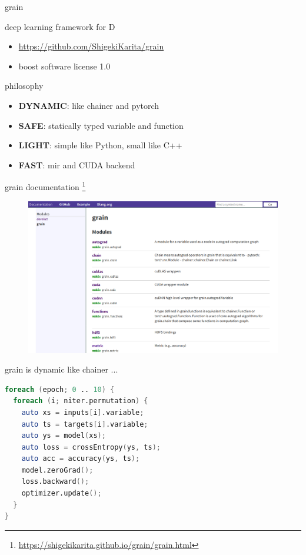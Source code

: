 \documentclass[aspectratio=169,
  14pt,xcolor=dvipsnames,table,professional font,dvipdfmx]{beamer}
\begin{document}
\begin{frame}{grain}
  \begin{alertblock}{deep learning framework for D}
    \begin{itemize}
    \item \alert{\url{https://github.com/ShigekiKarita/grain}}
    \item boost software license 1.0
    \end{itemize}
  \end{alertblock}
  \begin{exampleblock}{philosophy}
    \begin{itemize}
    \item \textbf{DYNAMIC}: like chainer and pytorch
    \item \textbf{SAFE}: statically typed variable and function
    \item \textbf{LIGHT}: simple like Python, small like C++
    \item \textbf{FAST}: mir and CUDA backend
    \end{itemize}
  \end{exampleblock}
\end{frame}

\begin{frame}[fragile]{grain}
  documentation
  \footnote{\alert{\url{https://shigekikarita.github.io/grain/grain.html}}}
  \begin{figure}[b]
	\centering
	\includegraphics[height=0.6\textheight]{./fig/doc.png}
  \end{figure}
  \scriptsize
\end{frame}

\begin{frame}[fragile]{grain is \alert{dynamic}}
like chainer ...
  \begin{lstlisting}[language=D]
foreach (epoch; 0 .. 10) {
  foreach (i; niter.permutation) {
    auto xs = inputs[i].variable;
    auto ts = targets[i].variable;
    auto ys = model(xs);
    auto loss = crossEntropy(ys, ts);
    auto acc = accuracy(ys, ts);
    model.zeroGrad();
    loss.backward();
    optimizer.update();
  }
}\end{lstlisting}
\end{frame}
\end{document}
